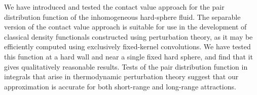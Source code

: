 \documentclass[letterpaper,twocolumn,amsmath,amssymb,pre,aps,10pt]{revtex4-1}
\begin{document}
We have introduced and tested the contact value approach for the pair
distribution function of the inhomogeneous hard-sphere fluid.  The
separable version of the contact value
approach is suitable for use in the development of classical
density functionals constructed using perturbation theory, as it
may be efficiently computed using exclusively fixed-kernel convolutions.  We have
tested this function at a hard wall and near a single fixed hard
sphere, and find that it gives qualitatively reasonable results.
Tests of the pair distribution function in integrals that arise in
thermodynamic perturbation theory suggest that our approximation is
accurate for both short-range and long-range attractions.

\end{document}
